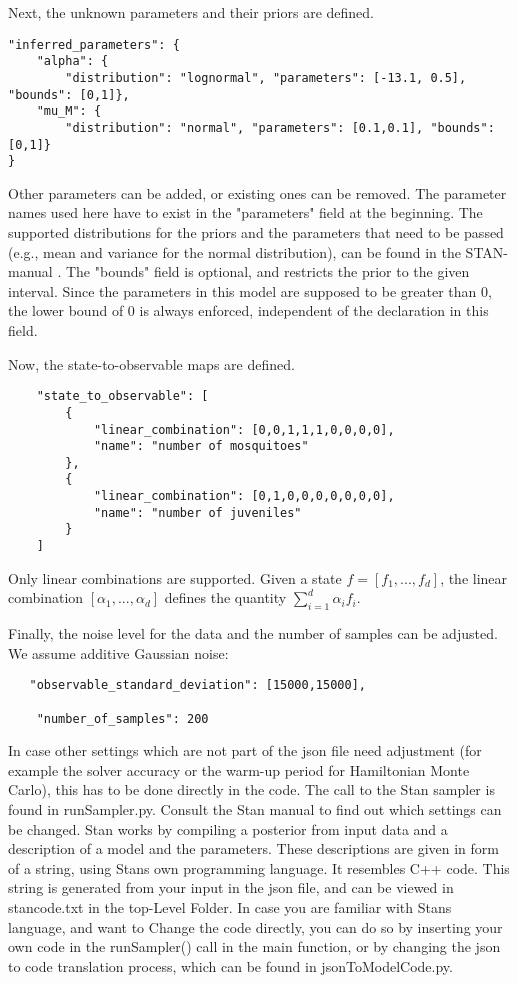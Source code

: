 \documentclass{article}
\begin{document}
Next, the unknown parameters and their priors are defined.
\begin{verbatim}
"inferred_parameters": {
    "alpha": {
        "distribution": "lognormal", "parameters": [-13.1, 0.5], "bounds": [0,1]},
    "mu_M": {
        "distribution": "normal", "parameters": [0.1,0.1], "bounds": [0,1]}
}
\end{verbatim}
Other parameters can be added, or existing ones can be removed. The parameter names used here have to exist in the "parameters" field at the beginning. The supported distributions for the priors and the parameters that need to be passed (e.g., mean and variance for the normal distribution), can be found in the STAN-manual \cite{StanManual}. The "bounds" field is optional, and restricts the prior to the given interval. Since the parameters in this model are supposed to be greater than $0$, the lower bound of $0$ is always enforced, independent of the declaration in this field.

Now, the state-to-observable maps are defined.
\begin{verbatim}
    "state_to_observable": [
        {
            "linear_combination": [0,0,1,1,1,0,0,0,0], 
            "name": "number of mosquitoes"
        },
        {
            "linear_combination": [0,1,0,0,0,0,0,0,0],
            "name": "number of juveniles"
        }
    ]
\end{verbatim}
Only linear combinations are supported. Given a state $f=[f_1,...,f_d]$, the linear combination $[\alpha_1,...,\alpha_d]$ defines the quantity $\sum_{i=1}^{d}\alpha_if_i$. 

Finally, the noise level for the data and the number of samples can be adjusted. We assume additive Gaussian noise:
\begin{verbatim}
   "observable_standard_deviation": [15000,15000],

    "number_of_samples": 200
\end{verbatim}

In case other settings which are not part of the json file need adjustment (for example the solver accuracy or the warm-up period for Hamiltonian Monte Carlo), this has to be done directly in the code. The call to the Stan sampler is found in runSampler.py. Consult the Stan manual to find out which settings can be changed. Stan works by compiling a posterior from input data and a description of a model and the parameters. These descriptions are given in form of a string, using Stans own programming language. It resembles C++ code. This string is generated from your input in the json file, and can be viewed in stancode.txt in the top-Level Folder. In case you are familiar with Stans language, and want to Change the code directly, you can do so by inserting your own code in the runSampler() call in the main function, or by changing the json to code translation process, which can be found in jsonToModelCode.py.
\end{document}
